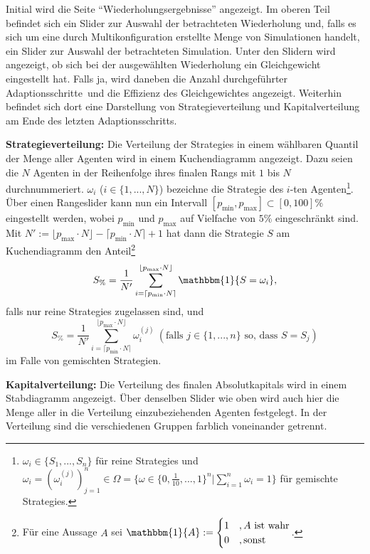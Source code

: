 \documentclass[parskip=full,11pt]{scrartcl}
\def\adapt{Adaptionsschritt}
\def\adapts{Adaptionsschritte}
\begin{document}
Initial wird die Seite \enquote{Wiederholungsergebnisse} angezeigt. Im oberen Teil befindet sich ein Slider zur Auswahl der betrachteten Wiederholung und, falls es sich um eine durch Multikonfiguration erstellte Menge von Simulationen handelt, ein Slider zur Auswahl der betrachteten Simulation. Unter den Slidern wird angezeigt, ob sich bei der ausgewählten Wiederholung ein \Gls{Gleichgewicht} eingestellt hat. Falls ja, wird daneben die Anzahl durchgeführter \adapts\ und die \Gls{Effizienz} des \Gls{Gleichgewicht}es angezeigt. Weiterhin befindet sich dort eine Darstellung von Strategieverteilung und Kapitalverteilung am Ende des letzten \adapt s.

\textbf{Strategieverteilung:}
Die Verteilung der \Glspl{Strategie} in einem wählbaren Quantil der Menge aller Agenten wird in einem Kuchendiagramm angezeigt. Dazu seien die \(N\) Agenten in der Reihenfolge ihres finalen Rangs mit \(1\) bis \(N\) durchnummeriert. \(\omega_i\) (\(i \in \{1,...,N\}\)) bezeichne die \Gls{Strategie} des \(i\)-ten Agenten\footnote{\(\omega_i \in \{S_1,...,S_n\}\) für reine \Glspl{Strategie} und \(\omega_i = (\omega_i^{(j)})_{j=1}^n \in \Omega = \{\omega \in \{0,\frac{1}{10},...,1\}^n | \sum_{i=1}^n \omega_i = 1\}\) für \glspl{gemischte Strategie}.}. Über einen Rangeslider kann nun ein Intervall \([p_\text{min},p_\text{max}] \subset [0,100]\%\) eingestellt werden, wobei \(p_\text{min}\) und \(p_\text{max}\) auf Vielfache von \(5\%\) eingeschränkt sind. Mit \(N' := \lfloor p_\text{max} \cdot N \rfloor - \lceil p_\text{min} \cdot N \rceil + 1\) hat dann die \Gls{Strategie} \(S\) am Kuchendiagramm den Anteil\footnote{Für eine Aussage \(A\) sei \(\mathbbm{1}\{A\} := \begin{cases} 1 & , A \text{ ist wahr} \\ 0 &, \text{sonst}\end{cases}\).}
\[
S_\% = \frac{1}{N'} \sum_{i=\lceil p_\text{min} \cdot N \rceil}^{\lfloor p_\text{max} \cdot N \rfloor} \mathbbm{1}\{S = \omega_i\},
\]
falls nur reine \Glspl{Strategie} zugelassen sind, und
\[
S_\% = \frac{1}{N'} \sum_{i=\lceil p_\text{min} \cdot N \rceil}^{\lfloor p_\text{max} \cdot N \rfloor} \omega_i^{(j)}  \ (\text{falls } j \in \{1,...,n\} \text{ so, dass } S = S_j)
\]
im Falle von gemischten Strategien.

\textbf{Kapitalverteilung:}
Die Verteilung des finalen Absolutkapitals wird in einem Stabdiagramm angezeigt. Über denselben Slider wie oben wird auch hier die Menge aller in die Verteilung einzubeziehenden Agenten festgelegt. In der Verteilung sind die verschiedenen Gruppen farblich voneinander getrennt.
\end{document}

